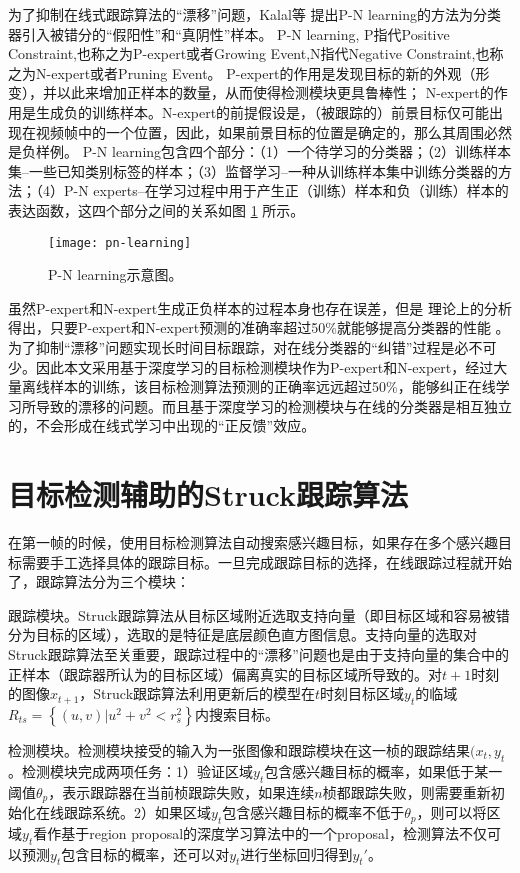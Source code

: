 为了抑制在线式跟踪算法的``漂移''问题，Kalal等 \cite{p-n}提出P-N learning的方法为分类器引入被错分的``假阳性''和``真阴性''样本。
P-N learning, P指代Positive Constraint,也称之为P-expert或者Growing Event,N指代Negative Constraint,也称之为N-expert或者Pruning Event。
P-expert的作用是发现目标的新的外观（形变），并以此来增加正样本的数量，从而使得检测模块更具鲁棒性；
N-expert的作用是生成负的训练样本。N-expert的前提假设是，（被跟踪的）前景目标仅可能出现在视频帧中的一个位置，因此，如果前景目标的位置是确定的，那么其周围必然是负样例。 P-N learning包含四个部分：（1）一个待学习的分类器；（2）训练样本集--一些已知类别标签的样本；（3）监督学习--一种从训练样本集中训练分类器的方法；（4）P-N experts--在学习过程中用于产生正（训练）样本和负（训练）样本的表达函数，这四个部分之间的关系如图 \ref{fig:pn-learning} 所示。
\begin{figure}[h]
	\centering
	\texttt{[image: pn-learning]}
	\caption{P-N learning示意图。}
	\label{fig:pn-learning}
\end{figure}

虽然P-expert和N-expert生成正负样本的过程本身也存在误差，但是
理论上的分析得出，只要P-expert和N-expert预测的准确率超过50\%就能够提高分类器的性能 \cite{p-n}。为了抑制``漂移''问题实现长时间目标跟踪，对在线分类器的``纠错''过程是必不可少。因此本文采用基于深度学习的目标检测模块作为P-expert和N-expert，经过大量离线样本的训练，该目标检测算法预测的正确率远远超过50\%，能够纠正在线学习所导致的漂移的问题。而且基于深度学习的检测模块与在线的分类器是相互独立的，不会形成在线式学习中出现的``正反馈''效应。

\section{目标检测辅助的Struck跟踪算法}
在第一帧的时候，使用目标检测算法自动搜索感兴趣目标，如果存在多个感兴趣目标需要手工选择具体的跟踪目标。一旦完成跟踪目标的选择，在线跟踪过程就开始了，跟踪算法分为三个模块：

跟踪模块。Struck跟踪算法从目标区域附近选取支持向量（即目标区域和容易被错分为目标的区域），选取的是特征是底层颜色直方图信息。支持向量的选取对Struck跟踪算法至关重要，跟踪过程中的``漂移''问题也是由于支持向量的集合中的正样本（跟踪器所认为的目标区域）偏离真实的目标区域所导致的。对$t+1$时刻的图像$x_{t+1}$，Struck跟踪算法利用更新后的模型在$t$时刻目标区域$y_t$的临域$R_{ts}=\left\{ {(u,v)|{u^2} + {v^2} < {r_s^2}}\right\}$内搜索目标。

检测模块。检测模块接受的输入为一张图像和跟踪模块在这一桢的跟踪结果$(x_t,y_t$。检测模块完成两项任务：1）验证区域$y_t$包含感兴趣目标的概率，如果低于某一阈值$\theta_p$，表示跟踪器在当前桢跟踪失败，如果连续$n$桢都跟踪失败，则需要重新初始化在线跟踪系统。2）如果区域$y_t$包含感兴趣目标的概率不低于$\theta_p$，则可以将区域$y_t$看作基于region proposal的深度学习算法中的一个proposal，检测算法不仅可以预测$y_t$包含目标的概率，还可以对$y_t$进行坐标回归得到$y_t'$。

